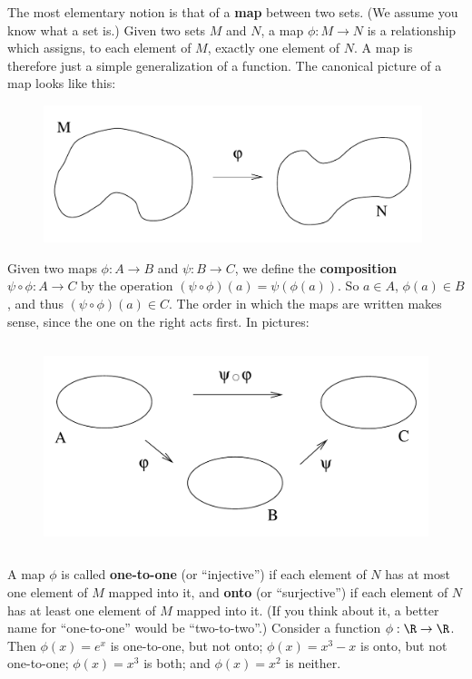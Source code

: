 \documentclass[12pt]{article}
\begin{document}
The most elementary notion is that of a {\bf map} between two sets.
(We assume you know what a set is.)  Given two sets $M$ and $N$, a
map $\phi: M\rightarrow N$ is a relationship which assigns, to each
element of $M$, exactly one element of $N$.  A map is therefore just a
simple generalization of a function.  The canonical picture of a
map looks like this:

\begin{figure}[h]
  \centerline{
  \includegraphics[height=4cm]{pdf/two4}}
\end{figure}

Given two maps $\phi: A\rightarrow B$ and $\psi:B\rightarrow C$,
we define the {\bf composition} $\psi\circ\phi: A\rightarrow C$
by the operation $(\psi\circ\phi)(a)=\psi(\phi(a))$.  So $a\in A$,
$\phi(a)\in B$, and thus $(\psi\circ\phi)(a)\in C$.  The order in
which the maps are written makes sense, since the one on the right
acts first.  In pictures:

\begin{figure}[h]
  \centerline{
  \includegraphics[height=6cm]{pdf/two5}}
\end{figure}

A map $\phi$ is called {\bf one-to-one} (or ``injective'') if each
element of $N$ has at most one element of $M$ mapped into it, and
{\bf onto} (or ``surjective'') if each element of $N$ has at least one 
element of $M$ mapped into it.  (If you think about it, a better name for
``one-to-one'' would be ``two-to-two''.)  Consider a function
$\phi: \R\rightarrow\R$.  Then $\phi(x)=e^x$ is one-to-one, but not onto;
$\phi(x)=x^3-x$ is onto, but not one-to-one; $\phi(x)=x^3$ is both; and
$\phi(x)=x^2$ is neither.  
\end{document}
